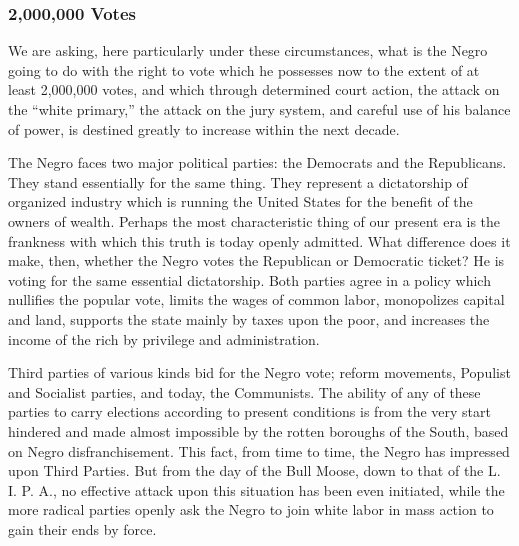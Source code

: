 \documentclass[letterpaper,10pt,english]{jupyterBook}
\begin{document}
\subsubsection{2,000,000 Votes}
\label{\detokenize{Volumes/40/06/strategy_of_the_negro_voter:votes}}
\sphinxAtStartPar
We are asking, here particularly under these circumstances, what is the Negro going to do with the right to vote which he possesses now to the extent of at least 2,000,000 votes, and which through determined court action, the attack on the “white primary,” the attack on the jury system, and careful use of his balance of power, is destined greatly to increase within the next decade.

\sphinxAtStartPar
The Negro faces two major political parties: the Democrats and the Republicans. They stand essentially for the same thing. They represent a dictatorship of organized industry which is running the United States for the benefit of the owners of wealth. Perhaps the most characteristic thing of our present era is the frankness with which this truth is today openly admitted. What difference does it make, then, whether the Negro votes the Republican or Democratic ticket? He is voting for the same essential dictatorship. Both parties agree in a policy which nullifies the popular vote, limits the wages of common labor, monopolizes capital and land, supports the state mainly by taxes upon the poor, and increases the income of the rich by privilege and administration.

\sphinxAtStartPar
Third parties of various kinds bid for the Negro vote; reform movements, Populist and Socialist parties, and today, the Communists. The ability of any of these parties to carry elections according to present conditions is from the very start hindered and made almost impossible by the rotten boroughs of the South, based on Negro disfranchisement. This fact, from time to time, the Negro has impressed upon Third Parties. But from the day of the Bull Moose, down to that of the L. I. P. A., no effective attack upon this situation has been even initiated, while the more radical parties openly ask the Negro to join white labor in mass action to gain their ends by force.
\end{document}
